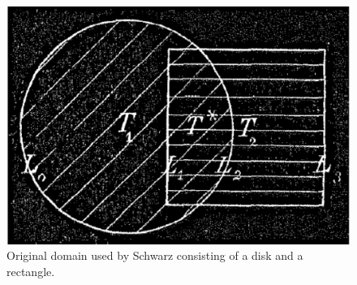 \begin{figure}[h!]
\centering
\includegraphics[scale=0.25]{figures/original_domain.pdf}
\caption{Original domain used by Schwarz consisting of a disk and a rectangle.}
\label{fig:back:orig_domain}
\end{figure}

